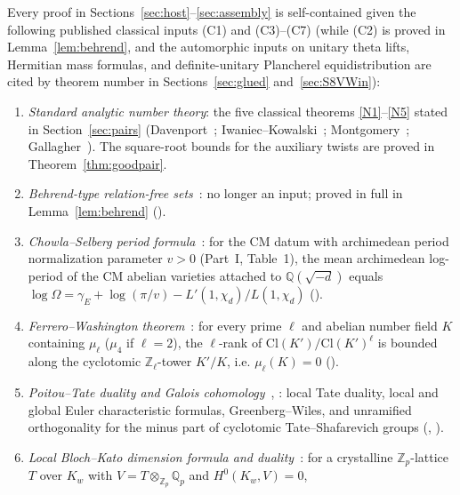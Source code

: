 \documentclass[11pt]{amsart}
\newcommand{\Z}{\mathbb{Z}}
\newcommand{\Q}{\mathbb{Q}}
\newcommand{\gE}{\gamma_{E}}
\theoremstyle{plain}
\theoremstyle{definition}
\numberwithin{equation}{section}
\begin{document}
Every proof in Sections~\ref{sec:host}--\ref{sec:assembly} is self-contained given the following
published classical inputs \textup{(C1)} and \textup{(C3)--(C7)} (while \textup{(C2)} is proved in
Lemma~\ref{lem:behrend}, and the automorphic inputs on unitary theta lifts, Hermitian mass
formulas, and definite-unitary Plancherel equidistribution are cited by theorem number in
Sections~\ref{sec:glued} and~\ref{sec:S8VWin}):
\begin{enumerate}[label=\textup{(C\arabic*)}, leftmargin=3.4em]
\item\label{C1} \emph{Standard analytic number theory}: the five classical theorems
  \ref{N1}--\ref{N5} stated in Section~\ref{sec:pairs} (Davenport~\cite[Ch.~14, 16, 19]{davenport};
  Iwaniec--Kowalski~\cite[Thm.~5.27, Ch.~18 Thm.~18.7]{iwaniec-kowalski};
  Montgomery~\cite[Thm.~12.2]{montgomery-topics}; Gallagher~\cite[Thm.~7]{gallagher}). The
  square-root bounds for the auxiliary twists are proved in Theorem~\ref{thm:goodpair}.
\item\label{C2} \emph{Behrend-type relation-free sets}~\cite{behrend}: no longer an input; proved in
  full in Lemma~\ref{lem:behrend} ().
\item\label{C3} \emph{Chowla--Selberg period formula}~\cite[eq.~(7), p.~110]{chowla-selberg}: for
  the CM datum with archimedean period normalization parameter $v>0$ (Part~I, Table~1), the mean
  archimedean log-period of the CM abelian varieties attached to $\Q(\sqrt{-d})$ equals
  $\log\Omega=\gE+\log(\pi/v)-L'(1,\chi_d)/L(1,\chi_d)$ ().
\item\label{C4} \emph{Ferrero--Washington theorem}~\cite[Main Theorem, p.~377]{ferrero-washington}:
  for every prime $\ell$ and abelian number field $K$ containing $\mu_\ell$ ($\mu_4$ if $\ell=2$),
  the $\ell$-rank of $\mathrm{Cl}(K')/\mathrm{Cl}(K')^\ell$ is bounded along the cyclotomic
  $\Z_\ell$-tower $K'/K$, i.e. $\mu_\ell(K)=0$ ().
\item\label{C5} \emph{Poitou--Tate duality and Galois cohomology}~\cite[Ch.~VIII, Thms.~8.6.7 and~8.7.4]{nsw},
  \cite[Ch.~I, Thms.~4.10 and~5.1]{milne}: local Tate duality, local and global Euler
  characteristic formulas, Greenberg--Wiles, and unramified orthogonality for the minus part of
  cyclotomic Tate--Shafarevich groups (, ).
\item\label{C6} \emph{Local Bloch--Kato dimension formula and duality}~\cite[Prop.~3.8, Cor.~3.8.4]{bloch-kato}:
  for a crystalline $\Z_p$-lattice $T$ over $K_w$ with $V=T\otimes_{\Z_p}\Q_p$ and $H^0(K_w,V)=0$,

\end{enumerate}
\end{document}
